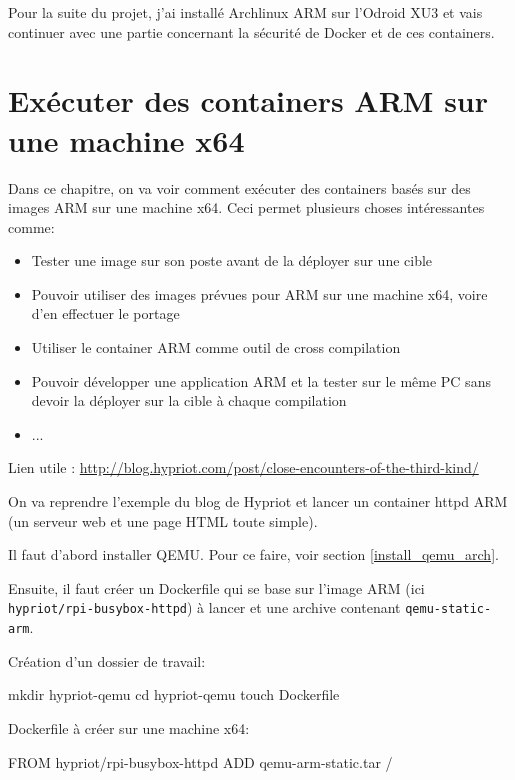 \documentclass[11pt,a4paper,oneside]{report}
\newcommand{\code}[1]{\texttt{#1}} %
\begin{document}
Pour la suite du projet, j'ai installé Archlinux ARM sur l'Odroid XU3 et vais continuer avec une partie concernant la sécurité de Docker et de ces containers.

\chapter{Exécuter des containers ARM sur une machine x64}\label{executer_containers_arm_sur_x64}

Dans ce chapitre, on va voir comment exécuter des containers basés sur des images ARM sur une machine x64. Ceci permet plusieurs choses intéressantes comme:

\begin{itemize}
\item Tester une image sur son poste avant de la déployer sur une cible
\item Pouvoir utiliser des images prévues pour ARM sur une machine x64, voire d'en effectuer le portage
\item Utiliser le container ARM comme outil de cross compilation
\item Pouvoir développer une application ARM et la tester sur le même PC sans devoir la déployer sur la cible à chaque compilation
\item ...
\end{itemize}


Lien utile : \url{http://blog.hypriot.com/post/close-encounters-of-the-third-kind/}

On va reprendre l'exemple du blog de Hypriot et lancer un container httpd ARM (un serveur web et une page HTML toute simple).

Il faut d'abord installer QEMU. Pour ce faire, voir section \ref{install_qemu_arch}.

Ensuite, il faut créer un Dockerfile qui se base sur l'image ARM (ici \code{hypriot/rpi-busybox-httpd}) à lancer et une archive contenant \code{qemu-static-arm}.

Création d'un dossier de travail:

\begin{bashcode}
mkdir hypriot-qemu
cd hypriot-qemu
touch Dockerfile
\end{bashcode}

Dockerfile à créer sur une machine x64:

\begin{bashcode}
FROM hypriot/rpi-busybox-httpd
ADD qemu-arm-static.tar /
\end{bashcode}
\end{document}
